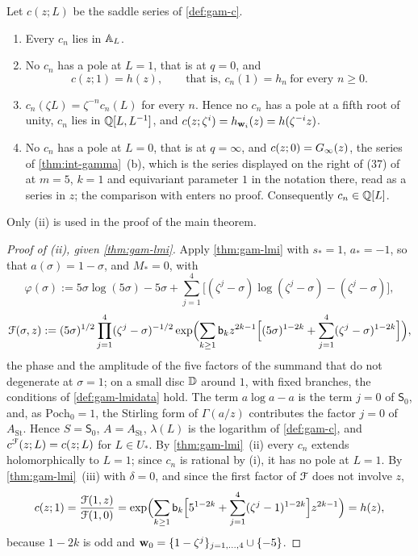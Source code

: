 \begin{thm}
\label{thm:gam-main}
Let $c(z;L)$ be the saddle series of \cref{def:gam-c}.
\begin{enumerate}
\item Every $c_n$ lies in $\mathbb{A}_{L}$.
\item No $c_n$ has a pole at $L=1$, that is at $q=0$, and
\[
c(z;1)=h(z),\qquad\text{that is, }c_n(1)=h_n\ \text{for every }n\geq0.\tag{$\Gamma$}
\]
\item $c_n(\zeta L)=\zeta^{-n}c_n(L)$ for every $n$. Hence no $c_n$ has a pole at a fifth root of unity, $c_n$ lies in $\mathbb{Q}[L,L^{-1}]$, and $c(z;\zeta^i)=h_{\mathbf{w}_i}(z)=h(\zeta^{-i}z)$.
\item No $c_n$ has a pole at $L=0$, that is at $q=\infty$, and $c(z;0)=G_{\infty}(z)$, the series of \cref{thm:int-gamma}~(b), which is the series displayed on the right of (37) of \cite[Lemma~7.7]{GJR18} at $m=5$, $k=1$ and equivariant parameter $1$ in the notation there, read as a series in $z$; the comparison with \cite{GJR18} enters no proof. Consequently $c_n\in\mathbb{Q}[L]$.
\end{enumerate}
Only (ii) is used in the proof of the main theorem.
\end{thm}

\begin{proof}[Proof of (ii), given \cref{thm:gam-lmi}]
Apply \cref{thm:gam-lmi} with $s_*=1$, $a_*=-1$, so that $a(\sigma)=1-\sigma$, and $M_*=0$, with
\[
\varphi(\sigma):=5\sigma\log(5\sigma)-5\sigma+\sum_{j=1}^4\bigl[(\zeta^j-\sigma)\log(\zeta^j-\sigma)-(\zeta^j-\sigma)\bigr],
\]
\[
\mathcal{F}(\sigma,z):=(5\sigma)^{1/2}\prod_{j=1}^4(\zeta^j-\sigma)^{-1/2}\exp\Bigl(\sum_{k\geq1}\mathsf{b}_kz^{2k-1}\Bigl[(5\sigma)^{1-2k}+\sum_{j=1}^4(\zeta^j-\sigma)^{1-2k}\Bigr]\Bigr),
\]
the phase and the amplitude of the five factors of the summand that do not degenerate at $\sigma=1$; on a small disc $\mathbb{D}$ around $1$, with fixed branches, the conditions of \cref{def:gam-lmidata} hold. The term $a\log a-a$ is the term $j=0$ of $\mathsf S_0$, and, as $\mathrm{Poch}_0=1$, the Stirling form of $\Gamma(a/z)$ contributes the factor $j=0$ of $A_{\mathrm{St}}$. Hence $S=\mathsf S_0$, $A=A_{\mathrm{St}}$, $\lambda(L)$ is the logarithm of \cref{def:gam-c}, and $c^{\mathcal{F}}(z;L)=c(z;L)$ for $L\in U_*$. By \cref{thm:gam-lmi}~(ii) every $c_n$ extends holomorphically to $L=1$; since $c_n$ is rational by (i), it has no pole at $L=1$. By \cref{thm:gam-lmi}~(iii) with $\delta=0$, and since the first factor of $\mathcal{F}$ does not involve $z$,
\[
c(z;1)=\frac{\mathcal{F}(1,z)}{\mathcal{F}(1,0)}=\exp\Bigl(\sum_{k\geq1}\mathsf{b}_k\Bigl[5^{1-2k}+\sum_{j=1}^4(\zeta^j-1)^{1-2k}\Bigr]z^{2k-1}\Bigr)=h(z),
\]
because $1-2k$ is odd and $\mathbf{w}_0=\{1-\zeta^j\}_{j=1,\dots,4}\cup\{-5\}$.
\end{proof}

